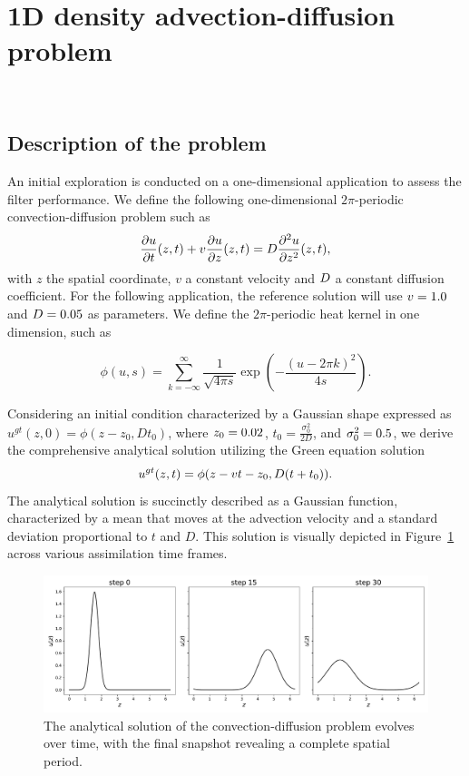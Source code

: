 \newpage

\section{1D density advection-diffusion problem}~\label{App_1D}
\subsection{Description of the problem}

An initial exploration is conducted on a one-dimensional application to assess the filter performance. We define the following one-dimensional $2\pi$-periodic convection-diffusion problem such as
\begin{equation*}
	\frac{\partial u}{\partial t}(z,t) + v \frac{\partial u}{\partial z}(z,t)  = D \frac{\partial^2 u}{\partial z^2}(z,t),
\end{equation*}
with $z$ the spatial coordinate, $v$ a constant velocity and $D$ a constant diffusion coefficient.
For the following application, the reference solution will use $v = 1.0$ and $D = 0.05$ as parameters.
We define the $2\pi$-periodic heat kernel in one dimension, such as

\begin{equation*}
	\phi(u, s) = \sum_{k=-\infty}^{\infty} \frac{1}{\sqrt{4 \pi s}} \exp{\left(-\frac{{(u - 2\pi k)}^2}{4s} \right)}.
\end{equation*}

Considering an initial condition characterized by a Gaussian shape expressed as $u^{gt}(z, 0) = \phi(z-z_0, Dt_0)$, where $z_0 = 0.02$, $t_0 = \frac{\sigma_0^2}{2D}$, and $\sigma_0^2 = 0.5$, we derive the comprehensive analytical solution utilizing the Green equation solution
\begin{equation*}
	u^{gt}(z, t) = \phi(z- v t - z_0, D (t+t_0)).
\end{equation*}The analytical solution is succinctly described as a Gaussian function, characterized by a mean that moves at the advection velocity and a standard deviation proportional to $t$ and $D$. This solution is visually depicted in Figure~\ref{fig:1d_analytical} across various assimilation time frames.

\begin{figure}[ht]
	\centering
	\includegraphics[width=\linewidth]{images/app1d/analytical_frame.pdf}
	\caption{The analytical solution of the convection-diffusion problem evolves over time, with the final snapshot revealing a complete spatial period.}
	\label{fig:1d_analytical}
\end{figure}

